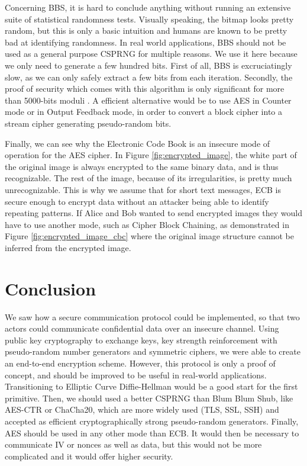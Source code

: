 \documentclass{article}
\begin{document}
\bigskip

Concerning BBS, it is hard to conclude anything without running an extensive suite of statistical randomness tests. Visually speaking, the bitmap looks pretty random, but this is only a basic intuition and humans are known to be pretty bad at identifying randomness\cite{Warren2018}.
In real world applications, BBS should not be used as a general purpose CSPRNG for multiple reasons. We use it here because we only need to generate a few hundred bits. First of all, BBS is excruciatingly slow, as we can only safely extract a few bits from each iteration. Secondly, the proof of security which comes with this algorithm is only significant for more than 5000-bits moduli \cite{blum:tightness} \cite{BlumBlum65:online}. A efficient alternative would be to use AES in Counter mode or in Output Feedback mode, in order to convert a block cipher into a stream cipher generating pseudo-random bits.

\bigskip

Finally, we can see why the Electronic Code Book is an insecure mode of operation for the AES cipher. In Figure \ref{fig:encrypted_image}, the white part of the original image is always encrypted to the same binary data, and is thus recognizable. The rest of the image, because of its irregularities, is pretty much unrecognizable. This is why we assume that for short text messages, ECB is secure enough to encrypt data without an attacker being able to identify repeating patterns. If Alice and Bob wanted to send encrypted images they would have to use another mode, such as Cipher Block Chaining, as demonstrated in Figure \ref{fig:encrypted_image_cbc} where the original image structure cannot be inferred from the encrypted image.

\section{Conclusion}

We saw how a secure communication protocol could be implemented, so that two actors could communicate confidential data over an insecure channel. Using public key cryptography to exchange keys, key strength reinforcement with pseudo-random number generators and symmetric ciphers, we were able to create an end-to-end encryption scheme. However, this protocol is only a proof of concept, and should be improved to be useful in real-world applications. Transitioning to Elliptic Curve Diffie-Hellman would be a good start for the first primitive. Then, we should used a better CSPRNG than Blum Blum Shub, like AES-CTR or ChaCha20, which are more widely used (TLS, SSL, SSH) and accepted as efficient cryptographically strong pseudo-random generators. Finally, AES should be used in any other mode than ECB. It would then be necessary to communicate IV or nonces as well as data, but this would not be more  complicated and it would offer higher security.   


\bigskip




\end{document}
